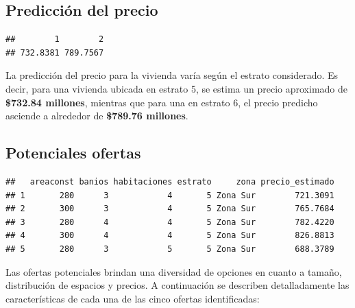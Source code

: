 \documentclass[
]{article}
\begin{document}
\subsection{\texorpdfstring{\textbf{Predicción del
precio}}{Predicción del precio}}\label{predicciuxf3n-del-precio}

\begin{verbatim}
##        1        2 
## 732.8381 789.7567
\end{verbatim}

La predicción del precio para la vivienda varía según el estrato
considerado. Es decir, para una vivienda ubicada en estrato 5, se estima
un precio aproximado de \textbf{\$732.84 millones}, mientras que para
una en estrato 6, el precio predicho asciende a alrededor de
\textbf{\$789.76 millones}.

\subsection{\texorpdfstring{\textbf{Potenciales
ofertas}}{Potenciales ofertas}}\label{potenciales-ofertas}

\begin{verbatim}
##   areaconst banios habitaciones estrato     zona precio_estimado
## 1       280      3            4       5 Zona Sur        721.3091
## 2       300      3            4       5 Zona Sur        765.7684
## 3       280      4            4       5 Zona Sur        782.4220
## 4       300      4            4       5 Zona Sur        826.8813
## 5       280      3            5       5 Zona Sur        688.3789
\end{verbatim}

Las ofertas potenciales brindan una diversidad de opciones en cuanto a
tamaño, distribución de espacios y precios. A continuación se describen
detalladamente las características de cada una de las cinco ofertas
identificadas:
\end{document}
